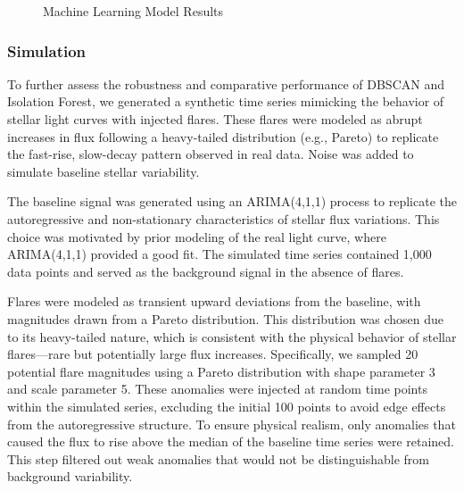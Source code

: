 \documentclass[
]{article}
\begin{document}
\begin{figure}[H]

{\centering {}

}

\caption{Machine Learning Model Results}\label{fig:ml}
\end{figure}

\subsubsection{Simulation}\label{simulation}

To further assess the robustness and comparative performance of DBSCAN and Isolation Forest, we generated a synthetic time series mimicking the behavior of stellar light curves with injected flares. These flares were modeled as abrupt increases in flux following a heavy-tailed distribution (e.g., Pareto) to replicate the fast-rise, slow-decay pattern observed in real data. Noise was added to simulate baseline stellar variability.

The baseline signal was generated using an ARIMA(4,1,1) process to replicate the autoregressive and non-stationary characteristics of stellar flux variations. This choice was motivated by prior modeling of the real light curve, where ARIMA(4,1,1) provided a good fit. The simulated time series contained 1,000 data points and served as the background signal in the absence of flares.

Flares were modeled as transient upward deviations from the baseline, with magnitudes drawn from a Pareto distribution. This distribution was chosen due to its heavy-tailed nature, which is consistent with the physical behavior of stellar flares---rare but potentially large flux increases. Specifically, we sampled 20 potential flare magnitudes using a Pareto distribution with shape parameter 3 and scale parameter 5. These anomalies were injected at random time points within the simulated series, excluding the initial 100 points to avoid edge effects from the autoregressive structure. To ensure physical realism, only anomalies that caused the flux to rise above the median of the baseline time series were retained. This step filtered out weak anomalies that would not be distinguishable from background variability.
\end{document}
